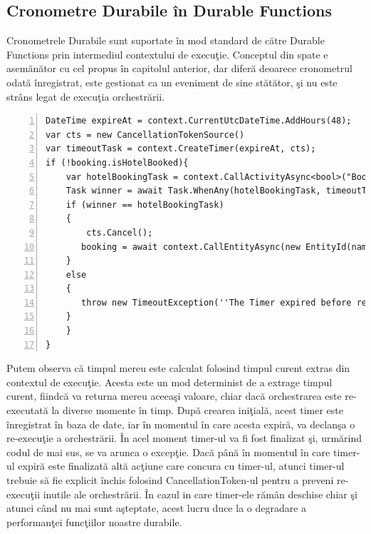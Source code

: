 \subsection{Cronometre Durabile în Durable Functions}
\quad Cronometrele Durabile sunt suportate în mod standard de către Durable Functions prin intermediul contextului de execuţie. Conceptul din spate e asemănător cu cel propus în capitolul anterior, dar diferă deoarece cronometrul odată înregistrat, este gestionat ca un eveniment de sine stătător, şi nu este strâns legat de execuţia orchestrării. 
\begin{lstlisting}[numbers=left]
DateTime expireAt = context.CurrentUtcDateTime.AddHours(48);
var cts = new CancellationTokenSource()
var timeoutTask = context.CreateTimer(expireAt, cts);
if (!booking.isHotelBooked){
	var hotelBookingTask = context.CallActivityAsync<bool>("BookFlight", null);
	Task winner = await Task.WhenAny(hotelBookingTask, timeoutTask);
    if (winner == hotelBookingTask)
    {
    	cts.Cancel();
       booking = await context.CallEntityAsync(new EntityId(nameof(Booking), entityGuid),"UpdateFlight", isFlightBooked);
    }
    else
    {
       throw new TimeoutException(''The Timer expired before receiving a response from the hotel activity'');
    }
	}	
}
\end{lstlisting}
\par Putem observa că timpul mereu este calculat folosind timpul curent extras din contextul de execuţie. Acesta este un mod determinist de a extrage timpul curent, fiindcă va returna mereu aceeaşi valoare, chiar dacă orchestrarea este re-executată la diverse momente în timp. După crearea iniţială, acest timer este înregistrat în baza de date, iar în momentul în care acesta expiră, va declanşa o re-execuţie a orchestrării. În acel moment timer-ul va fi fost finalizat şi, urmărind codul de mai sus, se va arunca o excepţie. Dacă până în momentul în care timer-ul expiră este finalizată altă acţiune care concura cu timer-ul, atunci timer-ul trebuie să fie explicit închis folosind CancellationToken-ul pentru a preveni re-execuţii inutile ale orchestrării. În cazul in care timer-ele rămân deschise chiar şi atunci când nu mai sunt aşteptate, acest lucru duce la o degradare a performanţei funcţiilor noastre durabile. 
